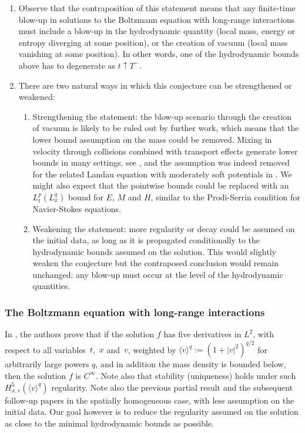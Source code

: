 \skpt
\begin{remarks}
\begin{enumerate}
\item Observe that the contraposition of this statement means that
any finite-time blow-up in solutions to the Boltzmann equation
with long-range interactions must include a blow-up in the
hydrodynamic quantity (local mass, energy or entropy diverging at
some position), or the creation of vacuum (local mass vanishing at
some position). In other words, one of the hydrodynamic bounds
above has to degenerate as $t \uparrow T^-$.

\item There are two natural ways in which this conjecture can be
strengthened or weakened:
\begin{enumerate}
\item Strengthening the statement: the blow-up scenario through
the creation of vacuum is likely to be ruled out by further
work, which means that the lower bound assumption on the mass
could be removed. Mixing in velocity through collisions combined
with transport effects generate lower bounds in many settings,
see \cite{MR2153518,MR2746671,MR3375544,MR3356579}, and the
assumption was indeed removed for the related Landau equation
with moderately soft potentials in \cite{henderson2017local}.
We might also expect that the pointwise bounds could be replaced
with an $L_t^p(L_x^q)$ bound for $E$, $M$ and $H$, similar to
the Prodi-Serrin condition for Navier-Stokes equations.
\item Weakening the statement: more regularity or decay could be
assumed on the initial data, as long as it is propagated
conditionally to the hydrodynamic bounds assumed on the
solution. This would slightly weaken the conjecture but the
contraposed conclusion would remain unchanged: any blow-up must
occur at the level of the hydrodynamic quantities.
\end{enumerate}
\end{enumerate}
\end{remarks}


\subsubsection{The Boltzmann equation with long-range interactions}
In \cite{amuxy-arma2010}, the authors prove that if the solution $f$ has
five derivatives in $L^2$, with respect to all variables~$t$,~$x$ and~$v$, weighted by $\langle v \rangle^q := (1+|v|^2)^{q/2}$ for
arbitrarily large powers $q$, and in addition the mass density is
bounded below, then the solution $f$ is $C^\infty$. Note also that
stability (uniqueness) holds under such
$H^5_{x,v}(\langle v \rangle^q)$ regularity. Note also the previous
partial result \cite{MR2038147} and the subsequent follow-up papers
\cite{MR2149928,MR2425608,MR2462585,MR2476677,MR2476686} in the
spatially homogeneous case, with less assumption on the initial
data. Our goal however is to reduce the regularity assumed on the
solution as close to the minimal hydrodynamic bounds as possible.

